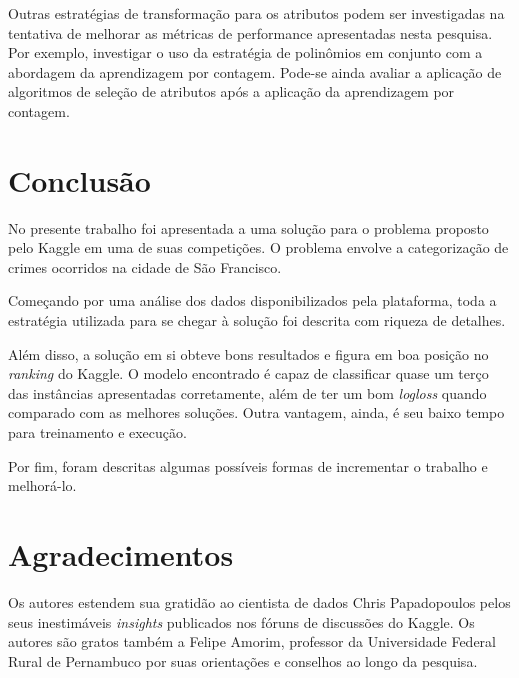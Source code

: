 \documentclass[conference]{IEEEtran}
\begin{document}
Outras estratégias de transformação para os atributos podem ser investigadas 
na tentativa de melhorar as métricas de performance apresentadas nesta pesquisa. 
Por exemplo, investigar o uso da estratégia de polinômios em conjunto com a 
abordagem da aprendizagem por contagem. Pode-se ainda avaliar a aplicação de 
algoritmos de seleção de atributos após a aplicação da aprendizagem por 
contagem.

\section{Conclusão}
No presente trabalho foi apresentada a uma solução para o problema proposto pelo 
Kaggle em uma de suas competições. O problema envolve a categorização de crimes 
ocorridos na cidade de São Francisco.

Começando por uma análise dos dados disponibilizados pela plataforma, toda a 
estratégia utilizada para se chegar à solução foi descrita com riqueza de 
detalhes.

Além disso, a solução em si obteve bons resultados e figura em boa posição no 
\textit{ranking} do Kaggle. O modelo encontrado é capaz de classificar quase um 
terço das instâncias apresentadas corretamente, além de ter um bom 
\textit{logloss} quando comparado com as melhores soluções. Outra vantagem, 
ainda, é seu baixo tempo para treinamento e execução.

Por fim, foram descritas algumas possíveis formas de incrementar o trabalho e 
melhorá-lo.

\section*{Agradecimentos}
Os autores estendem sua gratidão ao cientista de dados Chris Papadopoulos 
pelos seus inestimáveis \textit{insights} publicados nos fóruns de discussões do 
Kaggle. Os autores são gratos também a Felipe Amorim, professor da Universidade 
Federal Rural de Pernambuco por suas orientações e conselhos ao longo da 
pesquisa.



\end{document}
